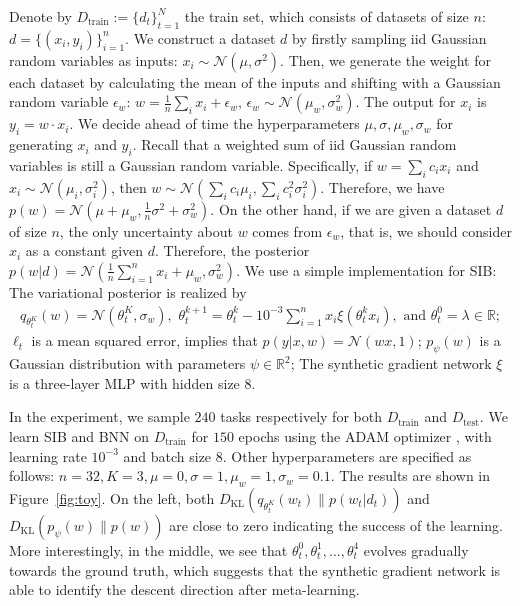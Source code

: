\documentclass{article} \usepackage{iclr2020_conference,times}
\newcommand{\R}{\mathbb{R}}
\begin{document}
Denote by $D_\text{train} := \{ d_t \}_{t=1}^N$ the train set, which consists of datasets of size $n$: $d = \{ (x_i, y_i) \}_{i=1}^n$.
We construct a dataset $d$ by firstly sampling iid Gaussian random variables as inputs: $x_i \sim \mathcal{N}(\mu, \sigma^2)$.
Then, we generate the weight for each dataset by calculating the mean of the inputs and shifting with a Gaussian random variable $\epsilon_w$:
$
w = \frac{1}{n} \sum_i x_i + \epsilon_w, \, \epsilon_w \sim \mathcal{N}(\mu_w, \sigma_w^2).
$
The output for $x_i$ is $y_i = w \cdot x_i.$
We decide ahead of time the hyperparameters $\mu, \sigma, \mu_w, \sigma_w$ for generating $x_i$ and $y_i$. 
Recall that a weighted sum of iid Gaussian random variables is still a Gaussian random variable.
Specifically, if $w = \sum_i c_i x_i$ and $x_i \sim \mathcal{N}(\mu_i, \sigma_i^2)$, 
then $w \sim \mathcal{N}(\sum_i c_i \mu_i, \sum_i c_i^2 \sigma_i^2)$.
Therefore, we have $p(w) = \mathcal{N}(\mu + \mu_w, \frac{1}{n}\sigma^2 + \sigma_w^2)$.
On the other hand, if we are given a dataset $d$ of size $n$, the only uncertainty about $w$ comes from $\epsilon_w$,
that is, we should consider $x_i$ as a constant given $d$.
Therefore, the posterior $p(w | d) = \mathcal{N}(\frac{1}{n} \sum_{i=1}^n x_i + \mu_w, \sigma_w^2)$.
We use a simple implementation for SIB:
The variational posterior is realized by
    \begin{align}
    \label{eq:toy}
        q_{\theta_t^K}(w) = \mathcal{N}(\theta_t^K, \sigma_w), \,\,
        \theta_t^{k+1} = \theta_t^{k} - 10^{-3} \sum_{i=1}^n x_i \xi(\theta_t^{k} x_i),\,\,\text{and}\,\, \theta_t^0 = \lambda \in \R;
    \end{align}
$\ell_t$ is a mean squared error, implies that $p(y|x,w) = \mathcal{N}(w x, 1)$;
$p_\psi(w)$ is a Gaussian distribution with parameters $\psi \in \R^2$;
The synthetic gradient network $\xi$ is a three-layer MLP with hidden size $8$.

In the experiment, we sample $240$ tasks respectively for both $D_\text{train}$ and $D_\text{test}$.
We learn SIB and BNN on $D_\text{train}$ for $150$ epochs using the ADAM optimizer \citep{kingma2014adam}, with learning rate $10^{-3}$
and batch size $8$.
Other hyperparameters are specified as follows:
$n = 32, K=3, \mu=0, \sigma=1, \mu_w=1, \sigma_w=0.1.$
The results are shown in Figure~\ref{fig:toy}. On the left, both 
$D_\text{KL}(q_{\theta_t^K}(w_t) \| p(w_t|d_t))$ and $D_\text{KL}(p_\psi(w) \| p(w))$ are close to zero
indicating the success of the learning. 
More interestingly, in the middle, we see that $\theta_t^0, \theta_t^1, \ldots, \theta_t^4$ evolves gradually towards the ground truth,
which suggests that the synthetic gradient network is able to identify the descent direction after meta-learning.
\end{document}

